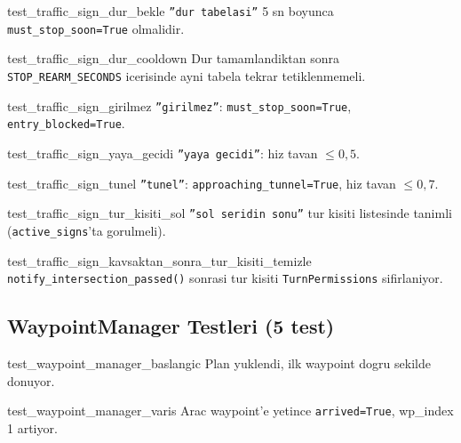 \documentclass[a4paper,12pt]{article}
\begin{document}
\begin{testbox}{test\_traffic\_sign\_dur\_bekle}
\texttt{''dur tabelasi''} 5 sn boyunca \texttt{must\_stop\_soon=True} olmalidir.
\end{testbox}

\begin{testbox}{test\_traffic\_sign\_dur\_cooldown}
Dur tamamlandiktan sonra \texttt{STOP\_REARM\_SECONDS} icerisinde
ayni tabela tekrar tetiklenmemeli.
\end{testbox}

\begin{testbox}{test\_traffic\_sign\_girilmez}
\texttt{''girilmez''}: \texttt{must\_stop\_soon=True},
\texttt{entry\_blocked=True}.
\end{testbox}

\begin{testbox}{test\_traffic\_sign\_yaya\_gecidi}
\texttt{''yaya gecidi''}: hiz tavan $\leq 0{,}5$.
\end{testbox}

\begin{testbox}{test\_traffic\_sign\_tunel}
\texttt{''tunel''}: \texttt{approaching\_tunnel=True},
hiz tavan $\leq 0{,}7$.
\end{testbox}

\begin{testbox}{test\_traffic\_sign\_tur\_kisiti\_sol}
\texttt{''sol seridin sonu''} tur kisiti listesinde tanimli
(\texttt{active\_signs}'ta gorulmeli).
\end{testbox}

\begin{testbox}{test\_traffic\_sign\_kavsaktan\_sonra\_tur\_kisiti\_temizle}
\texttt{notify\_intersection\_passed()} sonrasi tur kisiti
\texttt{TurnPermissions} sifirlaniyor.
\end{testbox}

\subsection{WaypointManager Testleri (5 test)}

\begin{testbox}{test\_waypoint\_manager\_baslangic}
Plan yuklendi, ilk waypoint dogru sekilde donuyor.
\end{testbox}

\begin{testbox}{test\_waypoint\_manager\_varis}
Arac waypoint'e yetince \texttt{arrived=True}, wp\_index 1 artiyor.
\end{testbox}
\end{document}
